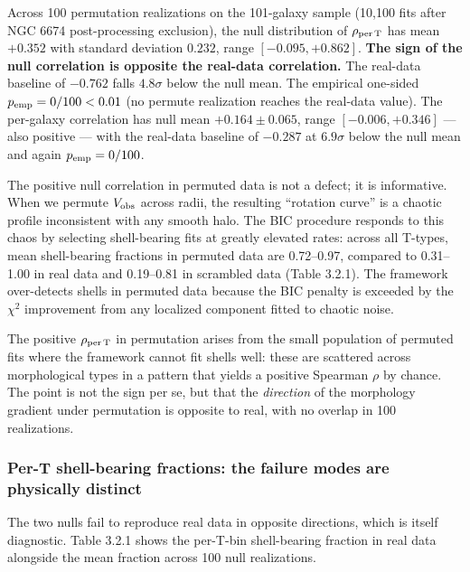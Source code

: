 \documentclass[linenumbers,trackchanges]{aastex701}
\begin{document}
Across 100 permutation realizations on the 101-galaxy sample (10,100 fits after NGC 6674 post-processing exclusion), the null distribution of $\rho_{\rm per\,T}$ has mean $+0.352$ with standard deviation $0.232$, range $[-0.095, +0.862]$. \textbf{The sign of the null correlation is opposite the real-data correlation.} The real-data baseline of $-0.762$ falls $4.8\sigma$ below the null mean. The empirical one-sided $p_{\rm emp} = 0/100 < 0.01$ (no permute realization reaches the real-data value). The per-galaxy correlation has null mean $+0.164 \pm 0.065$, range $[-0.006, +0.346]$ --- also positive --- with the real-data baseline of $-0.287$ at $6.9\sigma$ below the null mean and again $p_{\rm emp} = 0/100$.

The positive null correlation in permuted data is not a defect; it is informative. When we permute $V_{\rm obs}$ across radii, the resulting ``rotation curve'' is a chaotic profile inconsistent with any smooth halo. The BIC procedure responds to this chaos by selecting shell-bearing fits at greatly elevated rates: across all T-types, mean shell-bearing fractions in permuted data are 0.72--0.97, compared to 0.31--1.00 in real data and 0.19--0.81 in scrambled data (Table 3.2.1). The framework over-detects shells in permuted data because the BIC penalty is exceeded by the $\chi$$^{2}$ improvement from any localized component fitted to chaotic noise.

The positive $\rho_{\rm per\,T}$ in permutation arises from the small population of permuted fits where the framework cannot fit shells well: these are scattered across morphological types in a pattern that yields a positive Spearman $\rho$ by chance. The point is not the sign per se, but that the \emph{direction} of the morphology gradient under permutation is opposite to real, with no overlap in 100 realizations.

\subsubsection{Per-T shell-bearing fractions: the failure modes are physically distinct}

The two nulls fail to reproduce real data in opposite directions, which is itself diagnostic. Table 3.2.1 shows the per-T-bin shell-bearing fraction in real data alongside the mean fraction across 100 null realizations.
\end{document}
